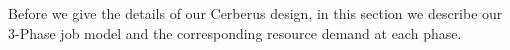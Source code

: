 Before we give the details of our Cerberus design, 
in this section we describe our 3-Phase job model 
and the corresponding resource demand at each phase. 





 
